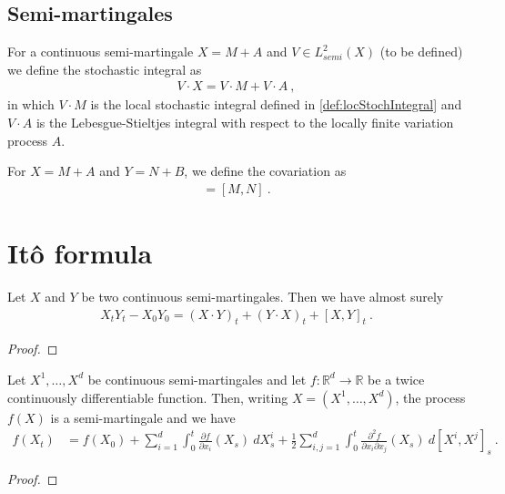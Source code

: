 \subsection{Semi-martingales}

\begin{definition}\label{def:stochIntegral}
For a continuous semi-martingale $X = M + A$ and $V \in L^2_{semi}(X)$ (to be defined) we define the stochastic integral as
\begin{align*}
  V \cdot X = V \cdot M + V \cdot A
  \: ,
\end{align*}
in which $V \cdot M$ is the local stochastic integral defined in \ref{def:locStochIntegral} and $V \cdot A$ is the Lebesgue-Stieltjes integral with respect to the locally finite variation process $A$.
\end{definition}


For $X = M + A$ and $Y = N + B$, we define the covariation as
\begin{align*}
  [X, Y] = [M, N]
  \: .
\end{align*}

\section{Itô formula}


\begin{theorem}\label{thm:integration_by_parts}
Let $X$ and $Y$ be two continuous semi-martingales. Then we have almost surely
\begin{align*}
  X_t Y_t - X_0 Y_0
  = (X \cdot Y)_t + (Y \cdot X)_t + [X,Y]_t
  \: .
\end{align*}
\end{theorem}

\begin{proof}

\end{proof}


\begin{theorem}\label{thm:Ito_formula}
Let $X^1, \ldots, X^d$ be continuous semi-martingales and let $f : \mathbb{R}^d \to \mathbb{R}$ be a twice continuously differentiable function.
Then, writing $X = (X^1, \ldots, X^d)$, the process $f(X)$ is a semi-martingale and we have
\begin{align*}
  f(X_t)
  &= f(X_0)
  + \sum_{i=1}^d \int_0^t \frac{\partial f}{\partial x_i}(X_s) \: dX^i_s
  + \frac{1}{2} \sum_{i,j=1}^d \int_0^t \frac{\partial^2 f}{\partial x_i \partial x_j}(X_s) \: d[X^i, X^j]_s
  \: .
\end{align*}
\end{theorem}

\begin{proof}

\end{proof}
